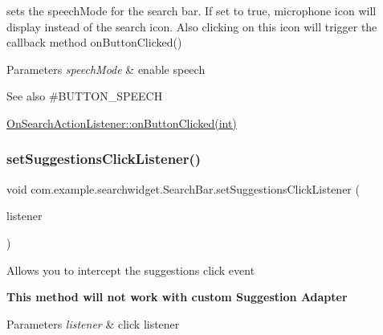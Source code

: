 sets the speech\+Mode for the search bar. If set to true, microphone icon will display instead of the search icon. Also clicking on this icon will trigger the callback method on\+Button\+Clicked()


\begin{DoxyParams}{Parameters}
{\em speech\+Mode} & enable speech \\
\hline
\end{DoxyParams}
\begin{DoxySeeAlso}{See also}
\#\+B\+U\+T\+T\+O\+N\+\_\+\+S\+P\+E\+E\+CH 

\mbox{\hyperlink{interfacecom_1_1example_1_1searchwidget_1_1_search_bar_1_1_on_search_action_listener_aece2474e59c571f0364cbe3bfffc982a}{On\+Search\+Action\+Listener\+::on\+Button\+Clicked(int)}} 
\end{DoxySeeAlso}
\mbox{\label{classcom_1_1example_1_1searchwidget_1_1_search_bar_a2c7e29edef133c2885ed261f14dcd329}} 
\subsubsection{\texorpdfstring{setSuggestionsClickListener()}{setSuggestionsClickListener()}}
{\footnotesize\ttfamily void com.\+example.\+searchwidget.\+Search\+Bar.\+set\+Suggestions\+Click\+Listener (\begin{DoxyParamCaption}\item[{Suggestions\+Adapter.\+On\+Item\+View\+Click\+Listener}]{listener }\end{DoxyParamCaption})}

Allows you to intercept the suggestions click event 

{\bfseries{This method will not work with custom Suggestion Adapter}}


\begin{DoxyParams}{Parameters}
{\em listener} & click listener \\
\hline
\end{DoxyParams}
\mbox{\label{classcom_1_1example_1_1searchwidget_1_1_search_bar_af24e5b6d3487e7ac76d615e5260a0054}} 
